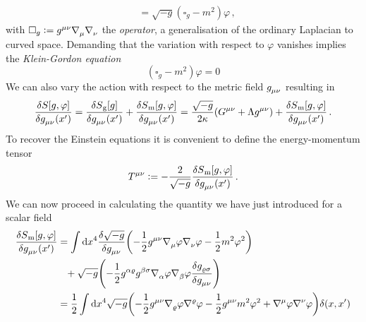 \begin{example}
\begin{equation}
\begin{split}
&=\sqrt{-g}\left(\square_{g}-m^2\right)\varphi\, ,
\end{split}
\end{equation}
with $\square_{g}:=\tensor{g}{^\mu^\nu}
\tensor{\nabla}{_\mu}\tensor{\nabla}{_\nu} $ the
\emph{ operator}, a generalisation of the ordinary
Laplacian to curved space.
Demanding that the variation with respect to $\varphi$ vanishes implies the
\emph{Klein-Gordon equation}
\begin{equation}
\left(\square_g-m^2\right)\varphi=0
\end{equation}
We can also vary the action with respect to the metric
field $\tensor{g}{_\mu_\nu}$ resulting in 
\begin{equation}
\frac{\delta S[g,\varphi]}{\delta
\tensor{g}{_\mu_\nu}\left(x'\right)}=
\frac{\delta S\textsubscript{g}[g]}{\delta
\tensor{g}{_\mu_\nu}\left(x'\right)}
+\frac{\delta S\textsubscript{m}[g,\varphi]}{\delta
\tensor{g}{_\mu_\nu}\left(x'\right)}
=\frac{\sqrt{-g}}{2\kappa}\left(\tensor{G}{^\mu^\nu}+\Lambda\tensor{g}{^\mu^\nu}
\right)+\frac{\delta S\textsubscript{m}[g,\varphi]}{\delta
\tensor{g}{_\mu_\nu}\left(x'\right)}\,.
\end{equation}
To recover the Einstein equations it is convenient to define the
energy-momentum tensor 
\begin{equation}
\tensor{T}{^\mu^\nu}:=-\frac{2}{\sqrt{-g}}\frac{\delta
S\textsubscript{m}[g,\varphi]}{\delta \tensor{g}{_\mu_\nu}\left(x'\right)}\,.
\end{equation}
We can now proceed in calculating the quantity we have just introduced for a
scalar field
\begin{equation}
\begin{split}
\frac{\delta
S\textsubscript{m}[g,\varphi]}{\delta \tensor{g}{_\mu_\nu}\left(x'\right)}
&=\int \dif x^4 \frac{\delta\sqrt{-g}}{\delta
\tensor{g}{_\mu_\nu}}\left(-\frac{1}{2}\tensor{g}{^\mu^\nu}
\tensor{\nabla}{_\mu}\varphi\tensor{\nabla}{_\nu}\varphi-\frac{1}{2}m^2\varphi^2\right)\\
&\phantom{=}+
\sqrt{-g}\left(-\frac{1}{2}\tensor{g}{^\alpha^\varrho}\tensor{g}{^\beta^\sigma} \tensor{\nabla}{_\alpha}\varphi\tensor{\nabla}{_\beta}\varphi\frac{\delta
\tensor{g}{_\varrho_\sigma}}{\delta \tensor{g}{_\mu_\nu}}\right)\\
&=\frac{1}{2}\int \dif x^4
\sqrt{-g}\left(-\frac{1}{2}\tensor{g}{^\mu^\nu}\tensor{\nabla}{_\varrho}\varphi\tensor{\nabla}{^\varrho}\varphi-\frac{1}{2}\tensor{g}{^\mu^\nu}m^2\varphi^2
+\tensor{\nabla}{^\mu}\varphi\tensor{\nabla}{^\nu}\varphi\right)\delta(x,x')\\

\end{split}
\end{equation}
\end{example}
